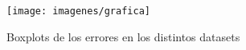 \begin{figure} [H]
	\centering
	\texttt{[image: imagenes/grafica]}
	\caption{Boxplots de los errores en los distintos datasets}
	\label{fig:grafica}
\end{figure}





